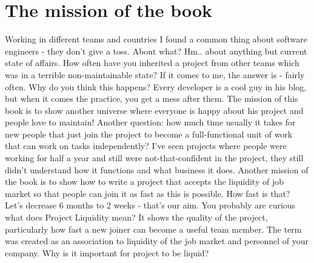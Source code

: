 
\section{The mission of the book}

Working in different teams and countries I found a common thing about software engineers - they don't give a toss. About what? Hm.. about anything but current state of affairs. How often have you inherited a project from other teams which was in a terrible non-maintainable state? If it comes to me, the answer is - fairly often. Why do you think this happens? Every developer is a cool guy in his blog, but when it comes the practice, you get a mess after them. The mission of this book is to show another universe where everyone is happy about his project and people love to maintain! 
Another question: how much time usually it takes for new people that just join the project to become a full-functional unit of work that can work on tasks independently? I've seen projects where people were working for half a year and still were not-that-confident in the project, they still didn't understand how it functions and what business it does. Another mission of the book is to show how to write a project that accepts the liquidity of job market so that people can join it as fast as this is possible. How fast is that? Let's decrease 6 months to 2 weeks - that's our aim.
You probably are curious what does Project Liquidity mean? It shows the quality of the project, particularly how fast a new joiner can become a useful team member. The term was created as an association to liquidity of the job market and personnel of your company. 
Why is it important for project to be liquid?

